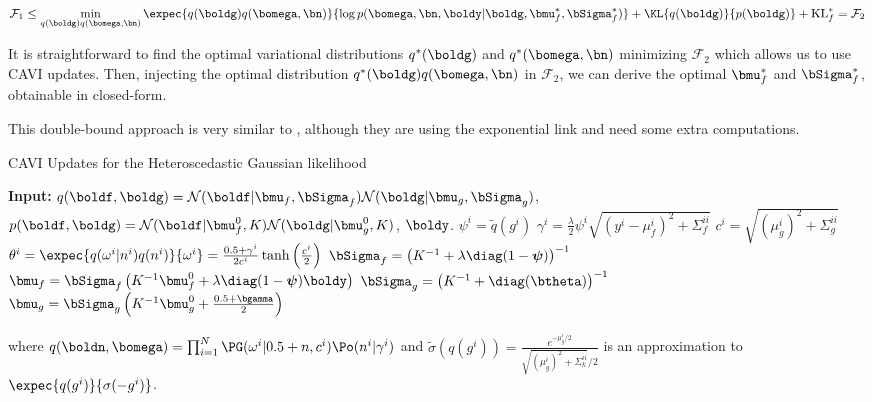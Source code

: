 \begin{align*}
    \mathcal{F}_1 \leq \min_{q(\boldg)q(\bomega,\bn)} \expec{q(\boldg)q(\bomega,\bn)}{\log p(\bomega,\bn,\boldy|\boldg,\bmu_f^*,\bSigma_f^*)} + \KL{q(\boldg)}{p(\boldg)} + \operatorname{KL}_f^*=\mathcal{F}_2
\end{align*}

It is straightforward to find the optimal variational distributions $q^*(\boldg)$ and $q^*(\bomega,\bn)$ minimizing $\mathcal{F}_2$ which allows us to use \ac{CAVI} updates.
Then, injecting the optimal distribution $q^*(\boldg)q(\bomega,\bn)$ in $\mathcal{F}_2$, we can derive the optimal $\bmu_f^*$ and $\bSigma_f^*$, obtainable in closed-form.

This double-bound approach is very similar to \citet{lazaro2011variational}, although they are using the exponential link and need some extra computations.

\begin{algorithm}[H]
    \caption{\ac{CAVI} Updates for the Heteroscedastic Gaussian likelihood}
    \begin{algorithmic}
        \State \textbf{Input:} $q(\boldf,\boldg) = \mathcal{N}(\boldf|\bmu_f,\bSigma_f)\mathcal{N}(\boldg|\bmu_g,\bSigma_g)$, $p(\boldf,\boldg) = \mathcal{N}(\boldf|\bmu^0_f, K)\mathcal{N}(\boldg|\bmu^0_g, K)$, $\boldy$.
            \State $\psi^i = \widetilde{q}(g^i)$
            \State $\gamma^i = \frac{\lambda}{2} \psi^i  \sqrt{(y^i - \mu_f^i)^2 + \Sigma_f^{ii}}$
            \State $c^i = \sqrt{(\mu_g^i)^2 + \Sigma^{ii}_g}$
            \State $\theta^i = \expec{q(\omega^i|n^i)q(n^i)}{\omega^i} = \frac{0.5 + \gamma^i}{2c^i}\tanh\left(\frac{c^i}{2}\right)$
            \State $\bSigma_f = \left(K^{-1} + \lambda\diag(1-\boldsymbol{\psi})\right)^{-1}$
            \State $\bmu_f = \bSigma_f\left(K^{-1}\bmu_f^0 + \lambda\diag(1 - \boldsymbol{\psi}) \boldy\right)$
            \State $\bSigma_g = \left(K^{-1} + \diag(\btheta)\right)^{-1}$
            \State $\bmu_g = \bSigma_g\left(K^{-1}\bmu_g^0 + \frac{0.5 + \bgamma}{2}\right)$
        \EndWhile
    \end{algorithmic}
    where $q(\boldn, \bomega) = \prod_{i=1}^N \PG(\omega^i|0.5 + n, c^i)\Po(n^i|\gamma^i)$ and $\widetilde{\sigma}(q(g^i)) = \frac{e^{-\mu_g^i/2}}{\sqrt{(\mu_g^i)^2 + \Sigma^{ii}_k} / 2}$ is an approximation to $\expec{q(g^i)}{\sigma(-g^i)}$.
\end{algorithm}

